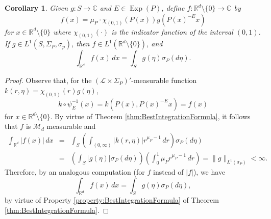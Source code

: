\documentclass[11pt, letter]{book}
\newtheorem{corollary}[theorem]{Corollary}
\newcommand\Exp{\operatorname{Exp}}
\begin{document}
\begin{framed}
\begin{corollary}\label{cor:IntegrateOnS}
Given $g:S\to\mathbb{C}$ and $E\in\Exp(P)$, define $f:\mathbb{R}^d\setminus \{0\}\to\mathbb{C}$ by
\begin{equation*}
f(x)=\mu_P\cdot \chi_{(0,1)}(P(x))g(P(x)^{-E}x)
\end{equation*}
for $x\in\mathbb{R}^d\setminus\{0\}$ where $\chi_{(0,1)}(\cdot)$ is the indicator function of the interval $(0,1)$. If $g\in L^1(S,\Sigma_P,\sigma_p)$, then $f\in L^1(\mathbb{R}^d\setminus\{0\})$, and 
\begin{equation*}
    \int_{\mathbb{R}^d}f(x)\,dx=\int_Sg(\eta)\sigma_P(d\eta).
\end{equation*}
\end{corollary}
\end{framed}
\begin{proof}
Observe that, for the $(\mathcal{L}\times\Sigma_P)'$-measurable function $k(r,\eta)=\chi_{(0,1)}(r)g(\eta)$,
\begin{equation*}
    k\circ\psi_E^{-1}(x)=k(P(x),P(x)^{-E}x)=f(x)
\end{equation*}
for $x\in\mathbb{R}^d\setminus \{0\}$. By virtue of Theorem \ref{thm:BestIntegrationFormula}, it follows that $f$ is $\mathcal{M}_d$ measurable and 
\begin{eqnarray*}
   \int_{\mathbb{R}^d}|f(x)|\,dx&=&\int_{S}\left(\int_{(0,\infty)}|k(r,\eta)|r^{\mu_P-1}\,dr\right)\sigma_P(d\eta)\\
    &=&\left(\int_S|g(\eta)|\sigma_P(d\eta)\right)\left(\int_0^1 \mu_Pr^{\mu_P-1}\,dr\right)=\|g\|_{L^1(\sigma_P)}<\infty.
\end{eqnarray*}
Therefore, by an analogous computation (for $f$ instead of $|f|$), we have
\begin{equation*}
    \int_{\mathbb{R}^d}f(x)\,dx=\int_S g(\eta)\sigma_P(d\eta),
\end{equation*}
by virtue of Property \ref{property:BestIntegrationFormula} of Theorem \ref{thm:BestIntegrationFormula}. 
\end{proof}
\end{document}
